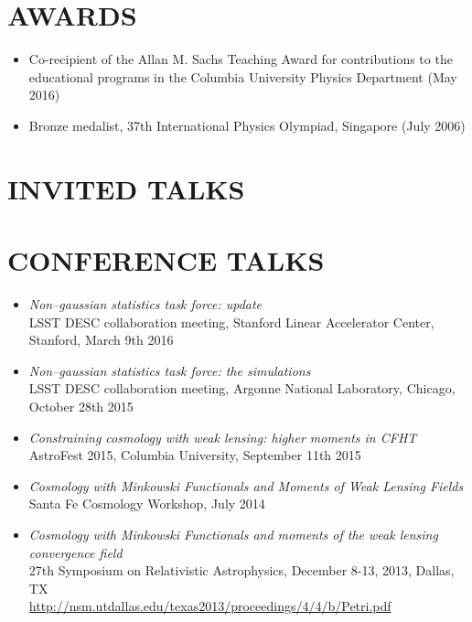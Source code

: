 \documentclass[margin]{res} %
\begin{document}
\begin{resume}

\section{AWARDS}
\begin{itemize}
\item Co-recipient of the Allan M. Sachs Teaching Award for contributions to the educational programs in the Columbia University Physics Department (May 2016)
\item Bronze medalist, 37th International Physics Olympiad, Singapore (July 2006) 
\end{itemize}


\section{INVITED TALKS}

\section{CONFERENCE TALKS}
\begin{itemize}

\item {\sl  Non--gaussian statistics task force: update}\\
LSST DESC collaboration meeting, Stanford Linear Accelerator Center, Stanford, March 9th 2016

\item {\sl  Non--gaussian statistics task force: the simulations}\\
LSST DESC collaboration meeting, Argonne National Laboratory, Chicago, October 28th 2015

\item {\sl Constraining cosmology with weak lensing: higher moments in CFHT}\\
AstroFest 2015, Columbia University, September 11th 2015

\item {\sl Cosmology with Minkowski Functionals and Moments of Weak Lensing Fields}\\
Santa Fe Cosmology Workshop, July 2014

\item{\sl Cosmology with Minkowski Functionals and moments of the weak lensing convergence field}\\
27th Symposium on Relativistic Astrophysics, December 8-13, 2013, Dallas, TX \\
\url{http://nsm.utdallas.edu/texas2013/proceedings/4/4/b/Petri.pdf}


\end{itemize}


\end{resume}
\end{document}
